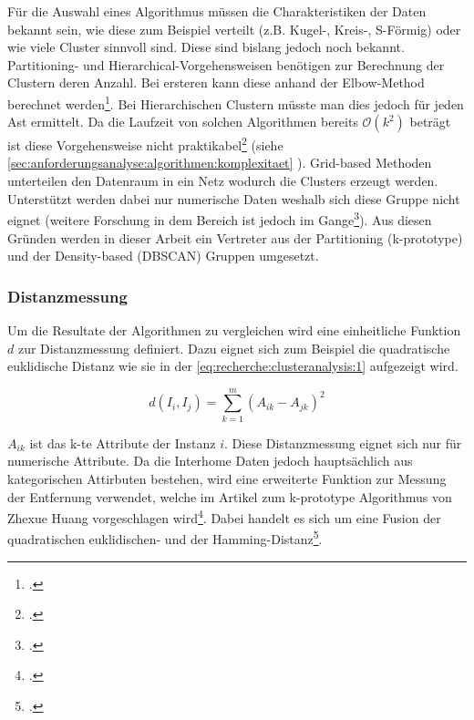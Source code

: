 Für die Auswahl eines Algorithmus müssen die Charakteristiken der Daten bekannt sein, wie diese zum Beispiel verteilt (z.B. Kugel-, Kreis-, S-Förmig) oder wie viele Cluster sinnvoll sind. Diese sind bislang jedoch noch bekannt.
Partitioning- und Hierarchical-Vorgehensweisen benötigen zur Berechnung der Clustern deren Anzahl. Bei ersteren kann diese anhand der Elbow-Method berechnet werden\footcite{elbow_method}. Bei Hierarchischen Clustern müsste man dies jedoch für jeden Ast ermittelt. Da die Laufzeit von solchen Algorithmen bereits $\mathcal{O}(k^2)$ beträgt ist diese Vorgehensweise nicht praktikabel\footcite{complexity_hierarchical_clustering} (siehe \cref{sec:anforderungsanalyse:algorithmen:komplexitaet} ). Grid-based Methoden unterteilen den Datenraum in ein Netz wodurch die Clusters erzeugt werden. Unterstützt werden dabei nur numerische Daten weshalb sich diese Gruppe nicht eignet (weitere Forschung in dem Bereich ist jedoch im Gange\footcite{sting_categorical_data}).
Aus diesen Gründen werden in dieser Arbeit ein Vertreter aus der Partitioning (k-prototype) und der Density-based (DBSCAN) Gruppen umgesetzt.


\subsubsection{Distanzmessung}
\label{sec:konzept:algorithmenauswahl:clustering:distanzmessung}
Um die Resultate der Algorithmen zu vergleichen wird eine einheitliche Funktion $d$ zur Distanzmessung definiert.
Dazu eignet sich zum Beispiel die quadratische euklidische Distanz wie sie in der \cref{eq:recherche:clusteranalysis:1} aufgezeigt wird.

\begin{equation} \label{eq:recherche:clusteranalysis:1}
d(I_i, I_j) = \sum_{k=1}^{m} (A_{ik} - A_{jk})^2
\end{equation}

$A_{ik}$ ist das k-te Attribute der Instanz $i$. 
Diese Distanzmessung eignet sich nur für numerische Attribute.
Da die Interhome Daten jedoch hauptsächlich aus kategorischen Attirbuten bestehen, wird  eine erweiterte Funktion zur Messung der Entfernung verwendet, welche im Artikel zum k-prototype Algorithmus von Zhexue Huang vorgeschlagen wird\footcite{clustering_numeric_and_categorical_values}.
Dabei handelt es sich um eine Fusion der quadratischen euklidischen- und der Hamming-Distanz\footcite{data_mining_concepts_and_techniques}.

